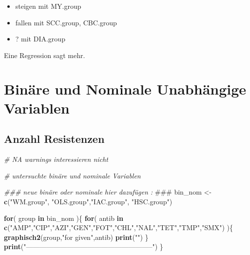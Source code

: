 \documentclass[
]{article}
\newenvironment{Shaded}{\begin{snugshade}}{\end{snugshade}}
\newcommand{\AlertTok}[1]{\textcolor[rgb]{0.94,0.16,0.16}{#1}}
\newcommand{\CommentTok}[1]{\textcolor[rgb]{0.56,0.35,0.01}{\textit{#1}}}
\newcommand{\ControlFlowTok}[1]{\textcolor[rgb]{0.13,0.29,0.53}{\textbf{#1}}}
\newcommand{\KeywordTok}[1]{\textcolor[rgb]{0.13,0.29,0.53}{\textbf{#1}}}
\newcommand{\NormalTok}[1]{#1}
\newcommand{\StringTok}[1]{\textcolor[rgb]{0.31,0.60,0.02}{#1}}
\providecommand{\tightlist}{%
  \setlength{\itemsep}{0pt}\setlength{\parskip}{0pt}}
\begin{document}
\begin{itemize}
\tightlist
\item
  steigen mit MY.group
\item
  fallen mit SCC.group, CBC.group
\item
  ? mit DIA.group
\end{itemize}

Eine Regression sagt mehr.

\hypertarget{binuxe4re-und-nominale-unabhuxe4ngige-variablen}{%
\section{Binäre und Nominale Unabhängige
Variablen}\label{binuxe4re-und-nominale-unabhuxe4ngige-variablen}}

\hypertarget{anzahl-resistenzen}{%
\subsection{Anzahl Resistenzen}\label{anzahl-resistenzen}}

\begin{Shaded}
\begin{Highlighting}[]
\CommentTok{# NA warnings interessieren nicht}

\CommentTok{# untersuchte binäre und nominale Variablen }

\CommentTok{### neue binäre oder nominale hier dazufügen : }\AlertTok{###}
\NormalTok{bin_nom <-}\StringTok{ }\KeywordTok{c}\NormalTok{(}\StringTok{"WM.group"}\NormalTok{, }\StringTok{"OLS.group"}\NormalTok{,}\StringTok{"IAC.group"}\NormalTok{,   }\StringTok{"HSC.group"}\NormalTok{)       }

\ControlFlowTok{for}\NormalTok{( group }\ControlFlowTok{in}\NormalTok{ bin_nom )\{}
  \ControlFlowTok{for}\NormalTok{( antib }\ControlFlowTok{in} \KeywordTok{c}\NormalTok{(}\StringTok{"AMP"}\NormalTok{,}\StringTok{"CIP"}\NormalTok{,}\StringTok{"AZI"}\NormalTok{,}\StringTok{"GEN"}\NormalTok{,}\StringTok{"FOT"}\NormalTok{,}\StringTok{"CHL"}\NormalTok{,}\StringTok{"NAL"}\NormalTok{,}\StringTok{"TET"}\NormalTok{,}\StringTok{"TMP"}\NormalTok{,}\StringTok{"SMX"}\NormalTok{) )\{}
    \KeywordTok{graphisch2}\NormalTok{(group,}\StringTok{"for given"}\NormalTok{,antib)  }
    \KeywordTok{print}\NormalTok{(}\StringTok{""}\NormalTok{)}
\NormalTok{  \} }
  \KeywordTok{print}\NormalTok{(}\StringTok{"--------------------------------------------------------"}\NormalTok{)}
\NormalTok{\}}
\end{Highlighting}
\end{Shaded}
\end{document}

